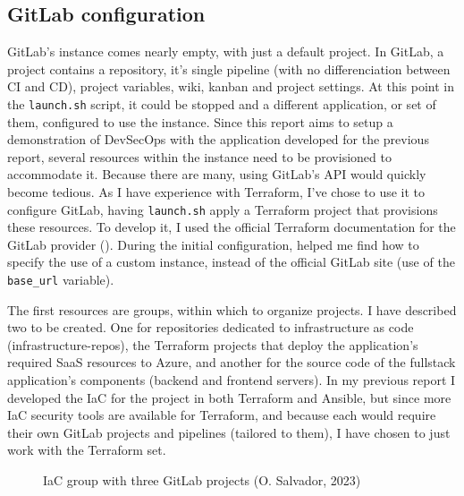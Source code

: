 \documentclass[11pt]{article}
\begin{document}
\begin{flushleft}
    \subsection{GitLab configuration}
    GitLab's instance comes nearly empty, with just a default project. In GitLab, a project contains a repository, it's single pipeline (with no differenciation between CI and CD), project variables, wiki, kanban and project settings. At this point in the \texttt{launch.sh} script, it could be stopped and a different application, or set of them, configured to use the instance. Since this report aims to setup a demonstration of DevSecOps with the application developed for the previous report, several resources within the instance need to be provisioned to accommodate it. Because there are many, using GitLab's API would quickly become tedious. As I have experience with Terraform, I've chose to use it to configure GitLab, having \texttt{launch.sh} apply a Terraform project that provisions these resources. To develop it, I used the official Terraform documentation for the GitLab provider (\cite{gitlabprovider}). During the initial configuration, \cite{seppanen} helped me find how to specify the use of a custom instance, instead of the official GitLab site (use of the \texttt{base\_url} variable).
    \linebreak
    
    The first resources are groups, within which to organize projects. I have described two to be created. One for repositories dedicated to infrastructure as code (infrastructure-repos), the Terraform projects that deploy the application's required SaaS resources to Azure, and another for the source code of the fullstack application's components (backend and frontend servers). In my previous report I developed the IaC for the project in both Terraform and Ansible, but since more IaC security tools are available for Terraform, and because each would require their own GitLab projects and pipelines (tailored to them), I have chosen to just work with the Terraform set. 
    \linebreak
    
        \begin{figure}[htb]
    		\centering
    		\caption{IaC group with three GitLab projects (O. Salvador, 2023)}
    	\end{figure}
     

\end{flushleft}
\end{document}
